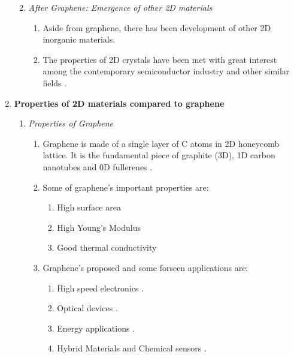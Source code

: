 \documentclass{article}
\begin{document}
\begin{enumerate}
\begin{enumerate}
\begin{enumerate}
			\end{enumerate}	%
		\item{\textit{After Graphene: Emergence of other 2D materials}}
			\begin{enumerate} %

				\item{Aside from graphene, there has been development of other 2D inorganic materials.}

				\item{The properties of 2D crystals have been met with great interest among the contemporary semiconductor industry and other similar fields \cite{2DflexibleNanoElectronics2014}.}

			\end{enumerate} %
	\end{enumerate} %

	\item{\textbf{Properties of 2D materials compared to graphene}}
		\begin{enumerate} %
			\item{\textit{Properties of Graphene}}
				\begin{enumerate} %

					\item{Graphene is made of a single layer of $\mathrm{C}$ atoms in 2D honeycomb lattice. It is the fundamental piece of graphite (3D), 1D carbon nanotubes and 0D fullerenes \cite{grapheneLike2Dreview2013}.}
					\item{Some of graphene's important properties are:}
						\begin{enumerate}
								\item{High surface area \cite{grapheneLike2Dreview2013}}
								\item{High Young's Modulus \cite{grapheneLike2Dreview2013}}
								\item{Good thermal conductivity}
						\end{enumerate}
				\item{Graphene's proposed and some forseen applications are:}
						\begin{enumerate}
							\item{High speed electronics \cite{LinGraphene2010}.}
							\item{Optical devices \cite{LiuOpticalGraphene2011}.}
							\item{Energy applications \cite{LiuOpticalGraphene2011, EnergyGraphene2009, ZhuEnergy2011}.}
							\item{Hybrid Materials and Chemical sensors \cite{LiuOpticalGraphene2011, El-Kady2012, XiYang2011, Giem2007}.}
						\end{enumerate}
				\end{enumerate} %


\end{enumerate}
\end{enumerate}
\end{document}
